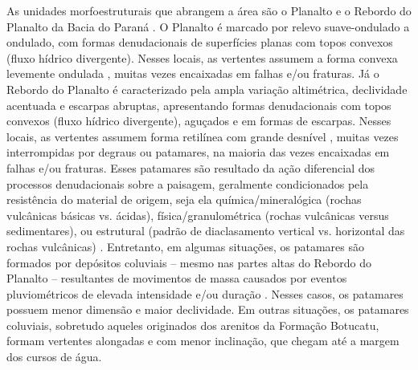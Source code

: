 As unidades morfoestruturais que abrangem a área são o Planalto e o Rebordo do Planalto da Bacia do Paraná 
\cite{NascimentoEtAl2010}. O Planalto é marcado por relevo suave-ondulado a ondulado, com formas denudacionais 
de superfícies planas com topos convexos (fluxo hídrico divergente). Nesses locais, as vertentes assumem a 
forma convexa levemente ondulada \cite{NascimentoEtAl2010}, muitas vezes encaixadas em falhas e/ou fraturas. 
Já o Rebordo do Planalto é caracterizado pela ampla variação altimétrica, declividade acentuada e escarpas 
abruptas, apresentando formas denudacionais com topos convexos (fluxo hídrico divergente), aguçados e em 
formas de escarpas. Nesses locais, as vertentes assumem forma retilínea com grande desnível 
\cite{NascimentoEtAl2010}, muitas vezes interrompidas por degraus ou patamares, na maioria das vezes 
encaixadas 
em falhas e/ou fraturas. Esses patamares são resultado da ação diferencial dos processos denudacionais sobre a 
paisagem, geralmente condicionados pela resistência do material de origem, seja ela química/mineralógica 
(rochas vulcânicas básicas vs. ácidas), física/granulométrica (rochas vulcânicas versus sedimentares), ou 
estrutural (padrão de diaclasamento vertical vs. horizontal das rochas vulcânicas) \cite{Holtz2003, 
Pedron2007, 
StreckEtAl2008}. Entretanto, em algumas situações, os patamares são formados por depósitos coluviais -- mesmo 
nas partes altas do Rebordo do Planalto -- resultantes de movimentos de massa causados por eventos 
pluviométricos de elevada intensidade e/ou duração \cite{PinheiroEtAl2004, PaisaniEtAl2010}. Nesses casos, os 
patamares possuem menor dimensão e maior declividade. Em outras situações, os patamares coluviais, sobretudo 
aqueles originados dos arenitos da Formação Botucatu, formam 
vertentes alongadas e com menor inclinação, que chegam até a margem dos cursos de água.


